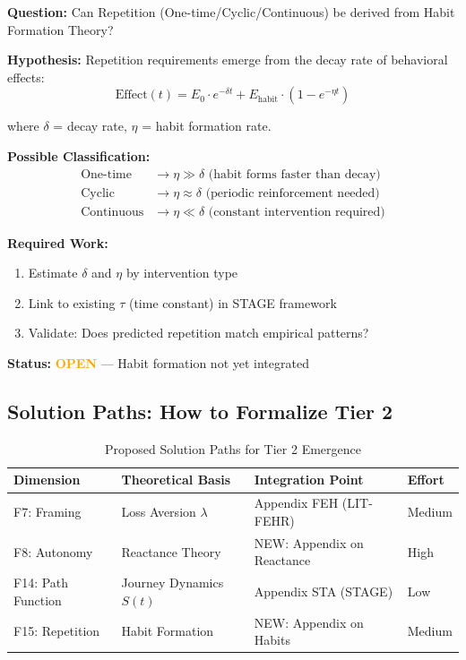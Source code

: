\begin{tcolorbox}[colback=yellow!5!white, colframe=yellow!75!black,
    title=\textbf{Research Question RQ-4: Repetition Emergence (F15)}]

\textbf{Question:} Can Repetition (One-time/Cyclic/Continuous) be derived from Habit Formation Theory?

\textbf{Hypothesis:} Repetition requirements emerge from the decay rate of behavioral effects:
\begin{equation}
\text{Effect}(t) = E_0 \cdot e^{-\delta t} + E_{\text{habit}} \cdot (1 - e^{-\eta t})
\end{equation}

where $\delta$ = decay rate, $\eta$ = habit formation rate.

\textbf{Possible Classification:}
\begin{align}
\text{One-time} &\rightarrow \eta \gg \delta \text{ (habit forms faster than decay)} \\
\text{Cyclic} &\rightarrow \eta \approx \delta \text{ (periodic reinforcement needed)} \\
\text{Continuous} &\rightarrow \eta \ll \delta \text{ (constant intervention required)}
\end{align}

\textbf{Required Work:}
\begin{enumerate}[nosep]
    \item Estimate $\delta$ and $\eta$ by intervention type
    \item Link to existing $\tau$ (time constant) in STAGE framework
    \item Validate: Does predicted repetition match empirical patterns?
\end{enumerate}

\textbf{Status:} \textcolor{orange}{\textbf{OPEN}} --- Habit formation not yet integrated
\end{tcolorbox}

\subsection{Solution Paths: How to Formalize Tier 2}

\begin{table}[htbp]
\centering
\caption{Proposed Solution Paths for Tier 2 Emergence}
\label{tab:hhh-solution-paths}
\renewcommand{\arraystretch}{1.3}
\small
\begin{tabular}{@{}llll@{}}
\toprule
\textbf{Dimension} & \textbf{Theoretical Basis} & \textbf{Integration Point} & \textbf{Effort} \\
\midrule
F7: Framing & Loss Aversion $\lambda$ & Appendix FEH (LIT-FEHR) & Medium \\
F8: Autonomy & Reactance Theory & NEW: Appendix on Reactance & High \\
F14: Path Function & Journey Dynamics $S(t)$ & Appendix STA (STAGE) & Low \\
F15: Repetition & Habit Formation & NEW: Appendix on Habits & Medium \\
\bottomrule
\end{tabular}
\end{table}

